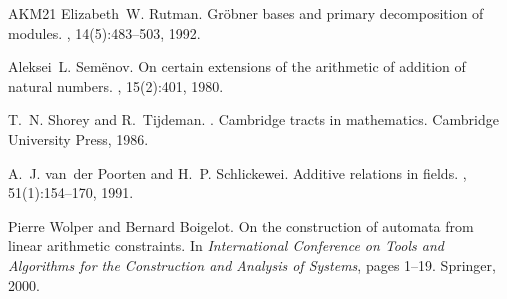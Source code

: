 \documentclass[letterpaper, 11pt, thm-restate]{article}
\numberwithin{equation}{section}
\theoremstyle{definition}
\theoremstyle{definition}
\theoremstyle{definition}
\begin{document}
\begin{thebibliography}{AKM{\etalchar{+}}21}
Elizabeth~W. Rutman.
\newblock Gr{\"o}bner bases and primary decomposition of modules.
, 14(5):483--503, 1992.

Aleksei~L. Sem\"{e}nov.
\newblock On certain extensions of the arithmetic of addition of natural numbers.
, 15(2):401, 1980.

T.~N. Shorey and R.~Tijdeman.
.
\newblock Cambridge tracts in mathematics. Cambridge University Press, 1986.

A.~J. van~der Poorten and H.~P. Schlickewei.
\newblock Additive relations in fields.
, 51(1):154--170, 1991.

Pierre Wolper and Bernard Boigelot.
\newblock On the construction of automata from linear arithmetic constraints.
\newblock In {\em International Conference on Tools and Algorithms for the Construction and Analysis of Systems}, pages 1--19. Springer, 2000.

\end{thebibliography}
\end{document}
